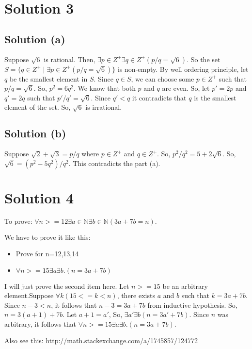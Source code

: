 \documentclass{article}
\begin{document}
\section{Solution 3}
\subsection{Solution (a)}
Suppose $\sqrt{6}$ is rational. Then, $\exists p \in Z^{+} \exists q \in Z^{+}(p/q = \sqrt{6})$. So the set $S = \{q \in Z^{+} \mid \exists p \in Z^{+}(p/q = \sqrt{6})\}$ is non-empty. By well ordering principle, let $q$ be the smallest element in $S$. Since $q \in S$, we can choose some $p \in Z^{+}$ such that $p/q = \sqrt{6}$. So, $p^2 = 6q^2$. We know that both $p$ and $q$ are even. So, let $p' = 2p$ and $q' = 2q$ such that $p'/q' = \sqrt{6}$. Since $q' < q$ it contradicts that $q$ is the smallest element of the set. So, $\sqrt{6}$ is irrational.

\subsection{Solution (b)}
Suppose $\sqrt{2} + \sqrt{3} = p/q$ where $p \in Z^{+}$ and $q \in Z^{+}$. So, $p^2 / q^2 = 5 + 2\sqrt{6}$. So, $\sqrt{6} = (p^2 - 5q^2)/q^2$. This contradicts the part (a).

\section{Solution 4}
To prove: $\forall n >= 12 \exists a \in \mathbb{N} \exists b \in \mathbb{N}(3a + 7b = n)$.

We have to prove it like this:

\begin{itemize}
  
\item 
  Prove for n=12,13,14
  
\item 
  $\forall n >= 15 \exists a \exists b. (n = 3a + 7b)$
\end{itemize}

I will just prove the second item here. Let $n >= 15$ be an arbitrary element.Suppose  $\forall k(  15 <= k < n)$, there exists $a$ and $b$ such that $k = 3a + 7b$. Since $n - 3 < n$, it follows that $n - 3 = 3a + 7b$ from inductive hypothesis. So, $n = 3(a + 1) + 7b$. Let $a + 1 = a'$, So, $\exists a' \exists b (n = 3a' + 7b)$. Since $n$ was arbitrary, it follows that $\forall n >= 15 \exists a \exists b. (n = 3a + 7b)$.

Also see this: http://math.stackexchange.com/a/1745857/124772
\end{document}
